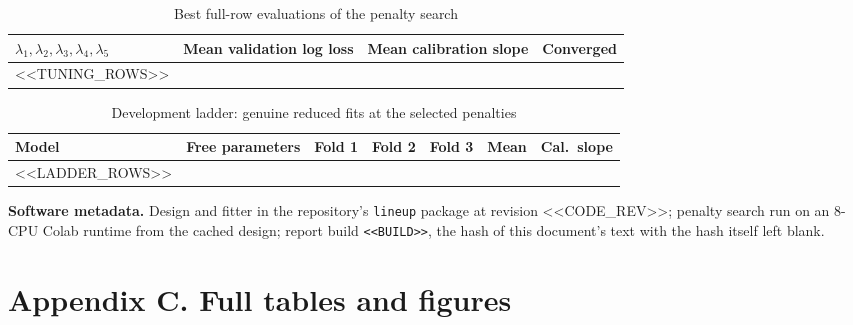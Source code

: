 \documentclass[11pt]{article}
\begin{document}
\begin{table}[H]\centering\footnotesize
\caption{Best full-row evaluations of the penalty search}\label{tab:tune}
\begin{tabular}{l r r r}
\toprule
$\lambda_1,\lambda_2,\lambda_3,\lambda_4,\lambda_5$ & Mean validation log loss & Mean calibration slope & Converged \\
\midrule
<<TUNING_ROWS>>
\bottomrule
\end{tabular}
\end{table}

\begin{table}[H]\centering\footnotesize
\caption{Development ladder: genuine reduced fits at the selected penalties}\label{tab:ladder}
\begin{tabular}{l r r r r r r}
\toprule
Model & Free parameters & Fold 1 & Fold 2 & Fold 3 & Mean & Cal.\ slope \\
\midrule
<<LADDER_ROWS>>
\bottomrule
\end{tabular}
\end{table}

\textbf{Software metadata.} Design and fitter in the repository's \texttt{lineup} package at revision
<<CODE_REV>>; penalty search run on an 8-CPU Colab runtime from the cached design; report build
\texttt{<<BUILD>>}, the hash of this document's text with the hash itself left blank.

\section*{Appendix C. Full tables and figures}
\end{document}
